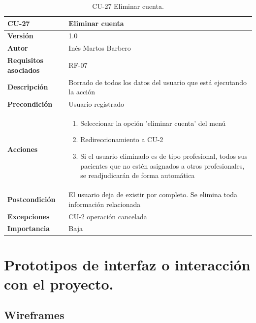 \begin{table}[p]
	\centering
	\begin{tabularx}{\linewidth}{ p{} p{} }
		\toprule
		\textbf{CU-27}    & \textbf{Eliminar cuenta}\\
		\toprule
		\textbf{Versión}              & 1.0    \\
		\textbf{Autor}                & Inés Martos Barbero \\
		\textbf{Requisitos asociados} & RF-07 \\
		\textbf{Descripción}          & Borrado de todos los datos del usuario que está ejecutando la acción \\
		\textbf{Precondición}         & Usuario registrado \\
		\textbf{Acciones}             &
		\begin{enumerate}
			\def\labelenumi{\arabic{enumi}.}
			\tightlist
			\item Seleccionar la opción 'eliminar cuenta' del menú
            \item Redireccionamiento a CU-2 
			\item Si el usuario eliminado es de tipo profesional, todos sus pacientes que no estén asignados a otros profesionales, se readjudicarán de forma automática
		\end{enumerate}\\
		\textbf{Postcondición}        & El usuario deja de existir por completo. Se elimina toda información relacionada \\
		\textbf{Excepciones}          & CU-2 operación cancelada \\
		\textbf{Importancia}          & Baja \\
		\bottomrule
	\end{tabularx}
	\caption{CU-27 Eliminar cuenta.}
\end{table}




\section{Prototipos de interfaz o interacción con el proyecto.}

\subsection{Wireframes}

